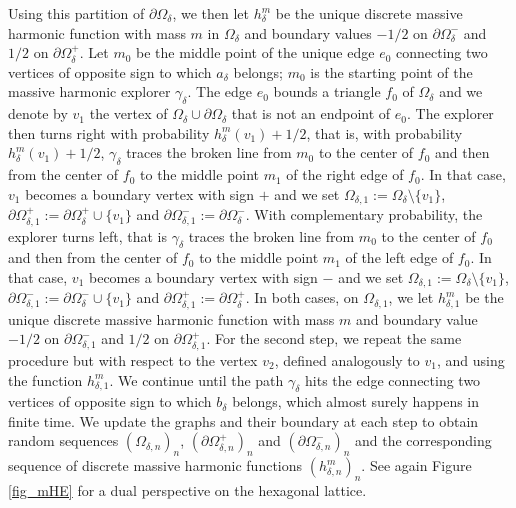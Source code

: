 \documentclass{article}
\theoremstyle{definition}
\theoremstyle{remark}
\theoremstyle{remark}
\begin{document}
Using this partition of $\partial \Omega_{\delta}$, we then let $h_{\delta}^{m}$ be the unique discrete massive harmonic function with mass $m$ in $\Omega_{\delta}$ and boundary values $-1/2$ on $\partial \Omega_{\delta}^{-}$ and $1/2$ on $\partial \Omega_{\delta}^{+}$. Let $m_0$ be the middle point of the unique edge $e_0$ connecting two vertices of opposite sign to which $a_{\delta}$ belongs; $m_0$ is the starting point of the massive harmonic explorer $\gamma_{\delta}$. The edge $e_0$ bounds a triangle $f_0$ of $\Omega_{\delta}$ and we denote by $v_1$ the vertex of $\Omega_{\delta} \cup \partial \Omega_{\delta}$ that is not an endpoint of $e_0$. The explorer then turns right with probability $h_{\delta}^m(v_1)+1/2$, that is, with probability $h_{\delta}^m(v_1)+1/2$, $\gamma_{\delta}$ traces the broken line from $m_0$ to the center of $f_0$ and then from the center of $f_0$ to the middle point $m_1$ of the right edge of $f_0$. In that case, $v_1$ becomes a boundary vertex with sign $+$ and we set $\Omega_{\delta, 1}:= \Omega_{\delta} \setminus \{v_1\}$, $\partial \Omega_{\delta, 1}^{+} := \partial \Omega_{\delta}^{+} \cup \{ v_1 \}$ and $\partial \Omega_{\delta, 1}^{-}:= \partial \Omega_{\delta}^{-}$. With complementary probability, the explorer turns left, that is $\gamma_{\delta}$ traces the broken line from $m_0$ to the center of $f_0$ and then from the center of $f_0$ to the middle point $m_1$ of the left edge of $f_0$. In that case, $v_1$ becomes a boundary vertex with sign $-$ and we set $\Omega_{\delta, 1}:= \Omega_{\delta} \setminus \{v_1\}$, $\partial \Omega_{\delta, 1}^{-} := \partial \Omega_{\delta}^{-} \cup \{ v_1 \}$ and $\partial \Omega_{\delta, 1}^{+}:= \partial \Omega_{\delta}^{+}$. In both cases, on $\Omega_{\delta,1}$, we let $h_{\delta, 1}^m$ be the unique discrete massive harmonic function with mass $m$ and boundary value $-1/2$ on $\partial \Omega_{\delta,1}^{-}$ and $1/2$ on $\partial \Omega_{\delta, 1}^{+}$. For the second step, we repeat the same procedure but with respect to the vertex $v_2$, defined analogously to $v_1$, and using the function $h_{\delta, 1}^{m}$. We continue until the path $\gamma_{\delta}$ hits the edge connecting two vertices of opposite sign to which $b_{\delta}$ belongs, which almost surely happens in finite time. We update the graphs and their boundary at each step to obtain random sequences $(\Omega_{\delta,n})_n$, $(\partial \Omega_{\delta,n}^{+})_n$ and $(\partial \Omega_{\delta,n}^{-})_n$ and the corresponding sequence of discrete massive harmonic functions $(h_{\delta,n}^m)_n$. See again Figure \ref{fig_mHE} for a dual perspective on the hexagonal lattice.
\end{document}
